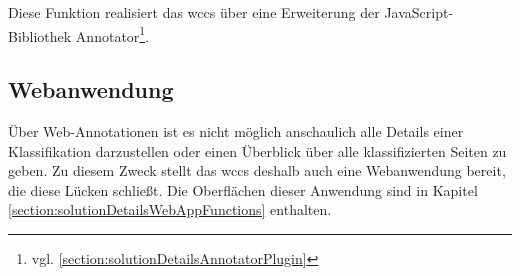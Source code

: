         Diese Funktion realisiert das \gls{wccs} über eine Erweiterung der JavaScript-Bibliothek
        Annotator\footnote{vgl. \ref{section:solutionDetailsAnnotatorPlugin}}.
    
    \subsection{Webanwendung}
        Über Web-Annotationen ist es nicht möglich anschaulich alle Details einer Klassifikation darzustellen
        oder einen Überblick über alle klassifizierten Seiten zu geben.
        Zu diesem Zweck stellt das \gls{wccs} deshalb auch eine Webanwendung bereit,
        die diese Lücken schließt.
        Die Oberflächen dieser Anwendung sind in Kapitel \ref{section:solutionDetailsWebAppFunctions}
        enthalten.
